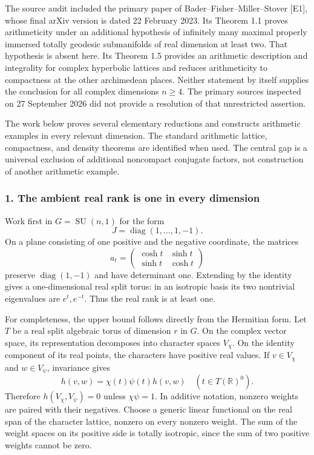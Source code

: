 \documentclass[11pt]{article}
\begin{document}
The source audit included the primary paper of Bader--Fisher--Miller--Stover [E1], whose final arXiv version is dated 22 February 2023. Its Theorem 1.1 proves arithmeticity under an additional hypothesis of infinitely many maximal properly immersed totally geodesic submanifolds of real dimension at least two. That hypothesis is absent here. Its Theorem 1.5 provides an arithmetic description and integrality for complex hyperbolic lattices and reduces arithmeticity to compactness at the other archimedean places. Neither statement by itself supplies the conclusion for all complex dimensions $n\ge4$. The primary sources inspected on 27 September 2026 did not provide a resolution of that unrestricted assertion.

The work below proves several elementary reductions and constructs arithmetic examples in every relevant dimension. The standard arithmetic lattice, compactness, and density theorems are identified when used. The central gap is a universal exclusion of additional noncompact conjugate factors, not construction of another arithmetic example.

\subsubsection{1. The ambient real rank is one in every dimension}
Work first in $G=\operatorname{SU}(n,1)$ for the form
\[
 J=\operatorname{diag}(1,\ldots,1,-1).
\]
On a plane consisting of one positive and the negative coordinate, the matrices
\[
 a_t=\begin{pmatrix}\cosh t&\sinh t\\
                         \sinh t&\cosh t\end{pmatrix}
 \tag{351.1}
\]
preserve $\operatorname{diag}(1,-1)$ and have determinant one. Extending by the identity gives a one-dimensional real split torus: in an isotropic basis its two nontrivial eigenvalues are $e^t,e^{-t}$. Thus the real rank is at least one.

For completeness, the upper bound follows directly from the Hermitian form. Let $T$ be a real split algebraic torus of dimension $r$ in $G$. On the complex vector space, its representation decomposes into character spaces $V_\chi$. On the identity component of its real points, the characters have positive real values. If $v\in V_\chi$ and $w\in V_\psi$, invariance gives
\[
 h(v,w)=\chi(t)\psi(t)h(v,w)\quad(t\in T(\mathbb R)^0).
\]
Therefore $h(V_\chi,V_\psi)=0$ unless $\chi\psi=1$. In additive notation, nonzero weights are paired with their negatives. Choose a generic linear functional on the real span of the character lattice, nonzero on every nonzero weight. The sum of the weight spaces on its positive side is totally isotropic, since the sum of two positive weights cannot be zero.
\end{document}
